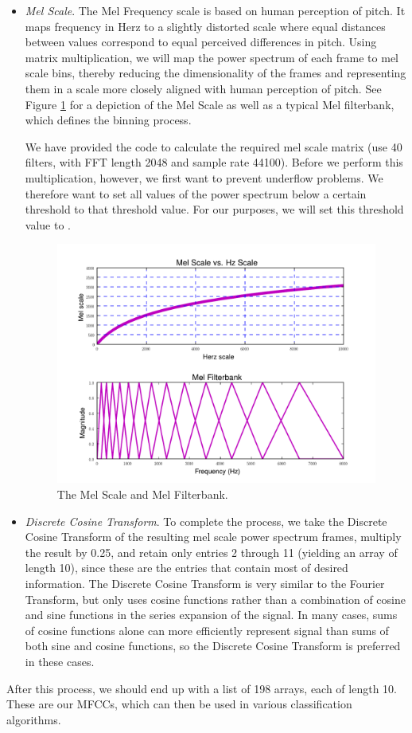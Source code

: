 \begin{itemize}
\item \emph{Mel Scale}. The Mel Frequency scale is based on human perception of pitch. It maps frequency
in Herz to a slightly distorted scale where equal distances between values correspond to equal perceived
differences in pitch. Using matrix multiplication, we will map the power spectrum of each frame to 
mel scale bins, thereby reducing the dimensionality of the frames and representing them in a scale 
more closely aligned with human perception of pitch. See Figure \ref{fourierext:mel} for a depiction
of the Mel Scale as well as a typical Mel filterbank, which defines the binning process.

We have provided the code to calculate the required mel scale
matrix (use 40 filters, with FFT length 2048 and sample rate 44100).
Before we perform this multiplication, however, we first want to prevent underflow problems. We
therefore want to set all values of the power spectrum below a certain threshold to that threshold value.
For our purposes, we will set this threshold value to .

\begin{figure}
\centering
\includegraphics[width=\textwidth]{melScale.pdf}
\caption{The Mel Scale and Mel Filterbank.}
\label{fourierext:mel}
\end{figure}

\item \emph{Discrete Cosine Transform}. To complete the process, we take the Discrete Cosine Transform
of the resulting mel scale power spectrum frames, multiply the result by 0.25, and retain only entries 2
through 11 (yielding an array of length 10), since these are the entries that contain most of desired
information. The Discrete Cosine Transform is very similar to the Fourier Transform, but only uses 
cosine functions rather than a combination of cosine and sine functions in the series expansion of the
signal. In many cases, sums of cosine functions alone can more efficiently represent signal than 
sums of both sine and cosine functions, so the Discrete Cosine Transform is preferred in these cases.
\end{itemize}
After this process, we should end up with a list of 198 arrays, each of length 10. These are our MFCCs,
which can then be used in various classification algorithms.

